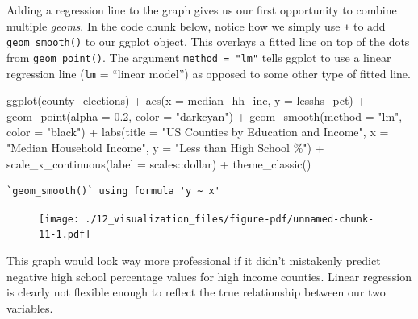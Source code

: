 \documentclass[
  letterpaper,
]{book}
\newenvironment{Shaded}{\begin{snugshade}}{\end{snugshade}}
\newcommand{\AttributeTok}[1]{\textcolor[rgb]{0.40,0.45,0.13}{#1}}
\newcommand{\FloatTok}[1]{\textcolor[rgb]{0.68,0.00,0.00}{#1}}
\newcommand{\FunctionTok}[1]{\textcolor[rgb]{0.28,0.35,0.67}{#1}}
\newcommand{\NormalTok}[1]{\textcolor[rgb]{0.00,0.23,0.31}{#1}}
\newcommand{\SpecialCharTok}[1]{\textcolor[rgb]{0.37,0.37,0.37}{#1}}
\newcommand{\StringTok}[1]{\textcolor[rgb]{0.13,0.47,0.30}{#1}}
\theoremstyle{definition}
\theoremstyle{definition}
\theoremstyle{plain}
\theoremstyle{definition}
\theoremstyle{plain}
\theoremstyle{plain}
\theoremstyle{remark}
\begin{document}
Adding a regression line to the graph gives us our first opportunity to
combine multiple \emph{geoms}. In the code chunk below, notice how we
simply use \texttt{+} to add \texttt{geom\_smooth()} to our ggplot
object. This overlays a fitted line on top of the dots from
\texttt{geom\_point()}. The argument \texttt{method\ =\ "lm"} tells
ggplot to use a linear regression line (\texttt{lm} = ``linear model'')
as opposed to some other type of fitted line.

\begin{Shaded}
\begin{Highlighting}[]
\FunctionTok{ggplot}\NormalTok{(county\_elections) }\SpecialCharTok{+}
  \FunctionTok{aes}\NormalTok{(}\AttributeTok{x =}\NormalTok{ median\_hh\_inc, }\AttributeTok{y =}\NormalTok{ lesshs\_pct) }\SpecialCharTok{+}
  \FunctionTok{geom\_point}\NormalTok{(}\AttributeTok{alpha =} \FloatTok{0.2}\NormalTok{, }\AttributeTok{color =} \StringTok{"darkcyan"}\NormalTok{) }\SpecialCharTok{+}
  \FunctionTok{geom\_smooth}\NormalTok{(}\AttributeTok{method =} \StringTok{"lm"}\NormalTok{, }\AttributeTok{color =} \StringTok{"black"}\NormalTok{) }\SpecialCharTok{+}
  \FunctionTok{labs}\NormalTok{(}\AttributeTok{title =} \StringTok{"US Counties by Education and Income"}\NormalTok{,}
       \AttributeTok{x =} \StringTok{"Median Household Income"}\NormalTok{,}
       \AttributeTok{y =} \StringTok{"Less than High School \%"}\NormalTok{) }\SpecialCharTok{+}
  \FunctionTok{scale\_x\_continuous}\NormalTok{(}\AttributeTok{label =}\NormalTok{ scales}\SpecialCharTok{::}\NormalTok{dollar) }\SpecialCharTok{+}
  \FunctionTok{theme\_classic}\NormalTok{()}
\end{Highlighting}
\end{Shaded}

\begin{verbatim}
`geom_smooth()` using formula 'y ~ x'
\end{verbatim}

\begin{figure}[H]

{\centering \texttt{[image: ./12\_visualization\_files/figure-pdf/unnamed-chunk-11-1.pdf]}

}

\end{figure}

This graph would look way more professional if it didn't mistakenly
predict negative high school percentage values for high income counties.
Linear regression is clearly not flexible enough to reflect the true
relationship between our two variables.
\end{document}
